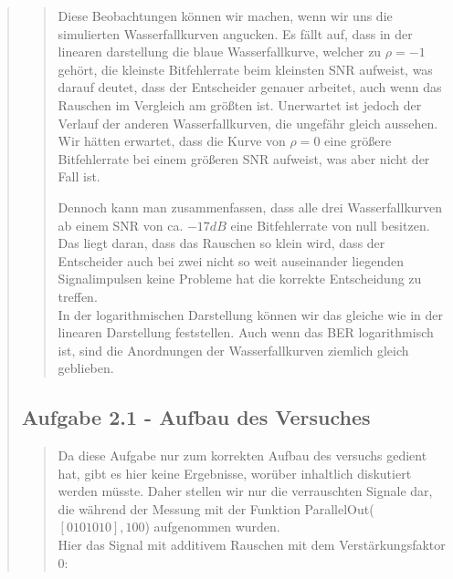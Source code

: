 \begin{quote}
\begin{quote}
                \vspace{2em}
    
    Diese Beobachtungen können wir machen, wenn wir uns die simulierten
    Wasserfallkurven angucken. Es fällt auf, dass in der linearen
    darstellung die blaue Wasserfallkurve, welcher zu $\rho = -1$ gehört, die
    kleinste Bitfehlerrate beim kleinsten SNR aufweist, was darauf deutet, dass
    der Entscheider genauer arbeitet, auch wenn das Rauschen im Vergleich am
    größten ist. Unerwartet ist jedoch der Verlauf der anderen Wasserfallkurven,
    die ungefähr gleich aussehen. Wir hätten erwartet, dass die Kurve von $\rho
    = 0$ eine größere Bitfehlerrate bei einem größeren SNR aufweist, was aber
    nicht der Fall ist. 
    
    
    Dennoch kann man zusammenfassen, dass alle drei Wasserfallkurven ab einem
    SNR von ca. $-17 dB$ eine Bitfehlerrate von null besitzen. Das liegt daran,
    dass das Rauschen so klein wird, dass der Entscheider auch bei zwei nicht so
    weit auseinander liegenden Signalimpulsen keine Probleme hat die korrekte
    Entscheidung zu treffen.\\
    
    In der logarithmischen Darstellung können wir das gleiche wie in der
    linearen Darstellung feststellen. Auch wenn das BER logarithmisch ist, sind
    die Anordnungen der Wasserfallkurven ziemlich gleich geblieben.
                
    \end{quote}  %
    
    \subsection{Aufgabe 2.1 - Aufbau des Versuches}
    \begin{quote}
        
        Da diese Aufgabe nur zum korrekten Aufbau des versuchs gedient hat, gibt
        es hier keine Ergebnisse, worüber inhaltlich diskutiert werden müsste.
        Daher stellen wir nur die verrauschten Signale dar, die während der
        Messung mit der Funktion ParallelOut($[0 1 0 1 0 1 0],100$) aufgenommen
        wurden.\\
        
        Hier das Signal mit additivem Rauschen mit dem Verstärkungsfaktor $0$:
        

\end{quote}
\end{quote}
